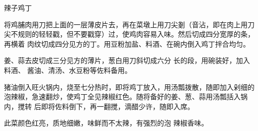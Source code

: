 \begin{recipe}{辣子鸡丁}

\ingredients



\cooking

\step 将鸡脯肉用刀把上面的一层薄皮片去，再在菜墩上用刀尖剗（音沾，即在肉上用刀
尖不规则的轻轻戳，但不要戳穿）过，使鸡肉容易入味。然后切成四分宽厚的条，再横着
肉纹切成四分见方的丁。用豆粉加盐、料酒、在碗内倒入鸡丁拌合均匀。

姜、蒜去皮切成三分见方的薄片，葱白用刀斜切成六分 长的段，用碗装好，加入料酒、
酱油、清汤、水豆粉等佐料备用。

\step 猪油倒入旺火锅内，烧至七分热时，即将鸡丁放入，用汤瓢拨散，随即加入剁细的
泡辣椒，急速翻炒，使鸡丁全见辣椒红色。随将备好的姜、葱、蒜用汤瓢括入锅内，搅转
后即将佐料倒下，再一翻搅，滴醋少许，随即入席。

\features

此菜颜色红亮，质地细嫩，味鲜而不太辣，有强烈的泡 辣椒香味。

\end{recipe}

